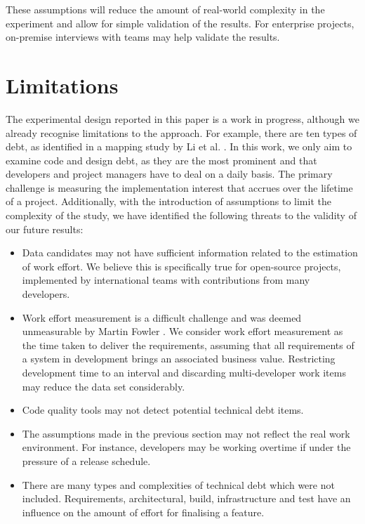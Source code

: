 These assumptions will reduce the amount of real-world complexity in the
experiment and allow for simple validation of the results. For enterprise
projects, on-premise interviews with teams may help validate the results.

\section{Limitations}
\label{limitations}

The experimental design reported in this paper is a work in progress, although
we already recognise limitations to the approach. For example, there are ten
types of debt, as identified in a mapping study by Li et al.  \cite{Li2015}. In
this work, we only aim to examine code and design debt, as they are the most
prominent and that developers and project managers have to deal on a daily
basis. The primary challenge is measuring the implementation interest that
accrues over the lifetime of a project. Additionally, with the introduction of
assumptions to limit the complexity of the study, we have identified the
following threats to the validity of our future results:

\begin{itemize}
	\item Data candidates may not have sufficient information related to the
	      estimation of work effort. We believe this is specifically true for
	      open-source projects, implemented by international teams with
	      contributions from many developers.
	\item Work effort measurement is a difficult challenge and was deemed
	      unmeasurable by Martin Fowler \cite{CannotMeasureProductivity}. We
	      consider work effort measurement as the time taken to deliver the
	      requirements, assuming that all requirements of a system in
	      development brings an associated business value. Restricting
	      development time to an interval and discarding multi-developer work
	      items may reduce the data set considerably.
	\item Code quality tools may not detect potential technical debt items.
	\item The assumptions made in the previous section may not reflect the
	      real work environment. For instance, developers may be working
	      overtime if under the pressure of a release schedule.
	\item There are many types and complexities of technical debt which were
	      not included. Requirements, architectural, build, infrastructure and
	      test have an influence on the amount of effort for finalising a
	      feature.
\end{itemize}

